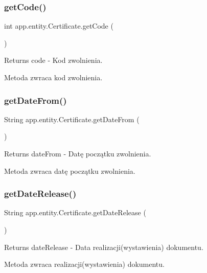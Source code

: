 \subsubsection{\texorpdfstring{getCode()}{getCode()}}
{\footnotesize\ttfamily int app.\+entity.\+Certificate.\+get\+Code (\begin{DoxyParamCaption}{ }\end{DoxyParamCaption})}

\begin{DoxyReturn}{Returns}
code -\/ Kod zwolnienia.
\end{DoxyReturn}
Metoda zwraca kod zwolnienia. \mbox{\label{classapp_1_1entity_1_1_certificate_ad3a854d7829e9ae8b5239d162e08631e}} 
\subsubsection{\texorpdfstring{getDateFrom()}{getDateFrom()}}
{\footnotesize\ttfamily String app.\+entity.\+Certificate.\+get\+Date\+From (\begin{DoxyParamCaption}{ }\end{DoxyParamCaption})}

\begin{DoxyReturn}{Returns}
date\+From -\/ Datę początku zwolnienia.
\end{DoxyReturn}
Metoda zwraca datę początku zwolnienia. \mbox{\label{classapp_1_1entity_1_1_certificate_a9e5d450b2becbd4475f10354635e46d2}} 
\subsubsection{\texorpdfstring{getDateRelease()}{getDateRelease()}}
{\footnotesize\ttfamily String app.\+entity.\+Certificate.\+get\+Date\+Release (\begin{DoxyParamCaption}{ }\end{DoxyParamCaption})}

\begin{DoxyReturn}{Returns}
date\+Release -\/ Data realizacji(wystawienia) dokumentu.
\end{DoxyReturn}
Metoda zwraca realizacji(wystawienia) dokumentu. \mbox{\label{classapp_1_1entity_1_1_certificate_a743634419f37915339bed55fb72bdf8e}} 

